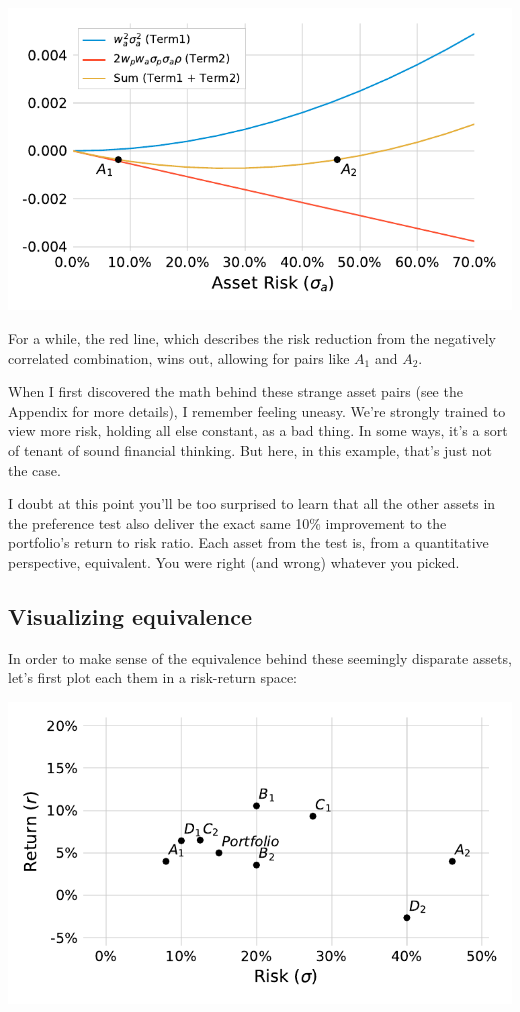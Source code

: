 \documentclass[]{article}
\begin{document}
\begin{center}\includegraphics{paper_files/figure-latex/Risk terms-1} \end{center}

For a while, the red line, which describes the risk reduction from the
negatively correlated combination, wins out, allowing for pairs like
\(A_1\) and \(A_2\).

When I first discovered the math behind these strange asset pairs (see
the Appendix for more details), I remember feeling uneasy. We're
strongly trained to view more risk, holding all else constant, as a bad
thing. In some ways, it's a sort of tenant of sound financial thinking.
But here, in this example, that's just not the case.

I doubt at this point you'll be too surprised to learn that all the
other assets in the preference test also deliver the exact same 10\%
improvement to the portfolio's return to risk ratio. Each asset from the
test is, from a quantitative perspective, equivalent. You were right
(and wrong) whatever you picked.

\hypertarget{visualizing-equivalence}{%
\subsection{Visualizing equivalence}\label{visualizing-equivalence}}

In order to make sense of the equivalence behind these seemingly
disparate assets, let's first plot each them in a risk-return space:

\begin{center}\includegraphics{paper_files/figure-latex/Scatter-1} \end{center}
\end{document}
